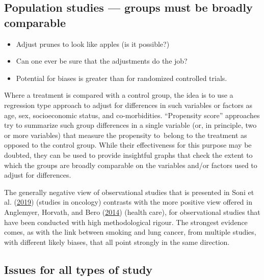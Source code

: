 \documentclass[
  10ptls,
  b5paper]{book}
\providecommand{\tightlist}{%
  \setlength{\itemsep}{0pt}\setlength{\parskip}{0pt}}
\begin{document}
\hypertarget{population-studies-groups-must-be-broadly-comparable}{%
\subsection*{Population studies --- groups must be broadly comparable}\label{population-studies-groups-must-be-broadly-comparable}}

\begin{itemize}
\tightlist
\item
  Adjust prunes to look like apples (is it possible?)
\item
  Can one ever be sure that the adjustments do the job?
\item
  Potential for biases is greater than for randomized controlled
  trials.
\end{itemize}

Where a treatment is compared with a control group, the idea is to use a
regression type approach to adjust for differences in such variables or
factors as age, sex, socioeconomic status, and co-morbidities.
``Propensity score'' approaches try to summarize such group differences in
a single variable (or, in principle, two or more variables) that measure
the propensity to~belong to the treatment as opposed to the control
group. While their effectiveness for this purpose may be doubted, they
can be used to provide insightful graphs that check the extent to which
the groups are broadly comparable on the variables and/or factors used
to adjust for differences.

The generally negative view of observational studies that is presented
in Soni et al. (\protect\hyperlink{ref-soni2019comparison}{2019}) (studies in oncology) contrasts with the more
positive view offered in Anglemyer, Horvath, and Bero (\protect\hyperlink{ref-anglemyer2014healthcare}{2014}) (health care), for
observational studies that have been conducted with high methodological
rigour. The strongest evidence comes, as with the link between smoking
and lung cancer, from multiple studies, with different likely biases,
that all point strongly in the same direction.

\hypertarget{issues-for-all-types-of-study}{%
\subsection*{Issues for all types of study}\label{issues-for-all-types-of-study}}
\end{document}
